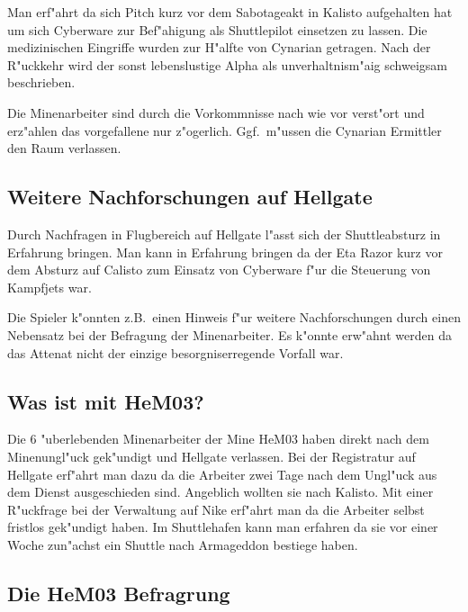 Man erf"ahrt da\3 sich Pitch kurz vor dem Sabotageakt in Kalisto aufgehalten hat um sich Cyberware zur Bef"ahigung als Shuttlepilot einsetzen zu lassen. Die medizinischen Eingriffe wurden zur H"alfte von Cynarian getragen. Nach der R"uckkehr wird der sonst lebenslustige Alpha als unverhaltnism"a\3ig schweigsam beschrieben.

\begin{remarks}
Die Minenarbeiter sind durch die Vorkommnisse nach wie vor verst"ort und erz"ahlen das vorgefallene nur z"ogerlich. Ggf.~m"ussen die Cynarian Ermittler den Raum verlassen.
\end{remarks}

\subsection{Weitere Nachforschungen auf Hellgate}

Durch Nachfragen in Flugbereich auf Hellgate l"asst sich der Shuttleabsturz in Erfahrung bringen. Man kann in Erfahrung bringen da\3 der Eta Razor kurz vor dem Absturz auf Calisto zum Einsatz von Cyberware f"ur die Steuerung von Kampfjets war.

\begin{remarks}
Die Spieler k"onnten z.B.~einen Hinweis f"ur weitere Nachforschungen durch einen Nebensatz bei der Befragung der Minenarbeiter. Es k"onnte erw"ahnt werden da\3 das Attenat nicht der einzige besorgniserregende Vorfall war.
\end{remarks}

\subsection{Was ist mit HeM03?}

Die 6 "uberlebenden Minenarbeiter der Mine HeM03 haben direkt nach dem Minenungl"uck gek"undigt und Hellgate verlassen. Bei der Registratur auf Hellgate erf"ahrt man dazu da\3 die Arbeiter zwei Tage nach dem Ungl"uck aus dem Dienst ausgeschieden sind. Angeblich wollten sie nach Kalisto. Mit einer R"uckfrage bei der Verwaltung auf
Nike erf"ahrt man da\3 die Arbeiter selbst fristlos gek"undigt haben. Im Shuttlehafen kann man erfahren da\3 sie vor einer Woche zun"achst ein Shuttle nach Armageddon bestiege haben.

\subsection{Die HeM03 Befragrung}

